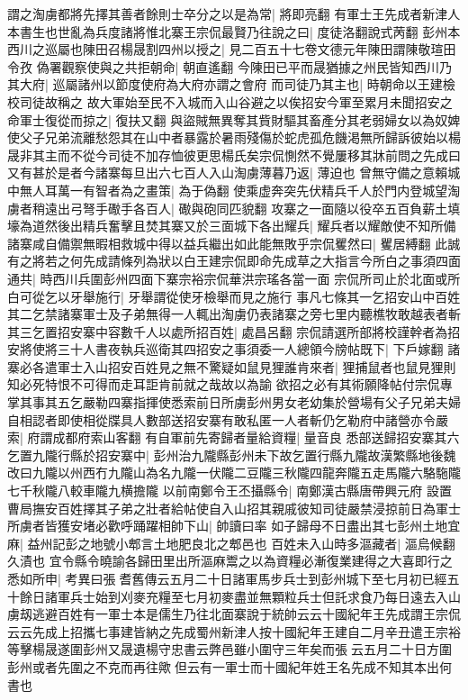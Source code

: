 謂之淘虜都將先擇其善者餘則士卒分之以是為常|{
	將即亮翻}
有軍士王先成者新津人本書生也世亂為兵度諸將惟北寨王宗侃最賢乃往說之曰|{
	度徒洛翻說式苪翻}
彭州本西川之巡屬也陳田召楊晟割四州以授之|{
	見二百五十七卷文德元年陳田謂陳敬瑄田令孜}
偽署觀察使與之共拒朝命|{
	朝直遙翻}
今陳田已平而晟猶據之州民皆知西川乃其大府|{
	巡屬諸州以節度使府為大府亦謂之會府}
而司徒乃其主也|{
	時朝命以王建檢校司徒故稱之}
故大軍始至民不入城而入山谷避之以俟招安今軍至累月未聞招安之命軍士復從而掠之|{
	復扶又翻}
與盜賊無異奪其貲財驅其畜產分其老弱婦女以為奴婢使父子兄弟流離愁怨其在山中者暴露於暑雨殘傷於蛇虎孤危饑渇無所歸訴彼始以楊晟非其主而不從今司徒不加存恤彼更思楊氏矣宗侃惻然不覺屢移其牀前問之先成曰又有甚於是者今諸寨每旦出六七百人入山淘虜薄暮乃返|{
	薄迫也}
曾無守備之意賴城中無人耳萬一有智者為之畫策|{
	為于偽翻}
使乘虚奔突先伏精兵千人於門内登城望淘虜者稍遠出弓弩手礮手各百人|{
	礮與砲同匹貌翻}
攻寨之一面隨以役卒五百負薪土填壕為道然後出精兵奮擊且焚其寨又於三面城下各出耀兵|{
	耀兵者以耀敵使不知所備}
諸寨咸自備禦無暇相救城中得以益兵繼出如此能無敗乎宗侃矍然曰|{
	矍居縛翻}
此誠有之將若之何先成請條列為狀以白王建宗侃即命先成草之大指言今所白之事須四面通共|{
	時西川兵圍彭州四面下寨宗裕宗侃華洪宗瑤各當一面}
宗侃所司止於北面或所白可從乞以牙舉施行|{
	牙舉謂從使牙檢舉而見之施行}
事凡七條其一乞招安山中百姓其二乞禁諸寨軍士及子弟無得一人輒出淘虜仍表諸寨之旁七里内聽樵牧敢越表者斬其三乞置招安寨中容數千人以處所招百姓|{
	處昌呂翻}
宗侃請選所部將校謹幹者為招安將使將三十人書夜執兵巡衛其四招安之事須委一人總領今牓帖既下|{
	下戶嫁翻}
諸寨必各遣軍士入山招安百姓見之無不驚疑如鼠見狸誰肯來者|{
	狸捕鼠者也鼠見狸則知必死特恨不可得而走耳詎肯前就之哉故以為諭}
欲招之必有其術願降帖付宗侃專掌其事其五乞嚴勒四寨指揮使悉索前日所虜彭州男女老幼集於營場有父子兄弟夫婦自相認者即使相從牒具人數部送招安寨有敢私匿一人者斬仍乞勒府中諸營亦令嚴索|{
	府謂成都府索山客翻}
有自軍前先寄歸者量給資糧|{
	量音良}
悉部送歸招安寨其六乞置九隴行縣於招安寨中|{
	彭州治九隴縣彭州未下故乞置行縣九隴故漢繁縣地後魏改曰九隴以州西冇九隴山為名九隴一伏隴二豆隴三秋隴四龍奔隴五走馬隴六駱駞隴七千秋隴八較車隴九横擔隴}
以前南鄭令王丕攝縣令|{
	南鄭漢古縣唐帶興元府}
設置曹局撫安百姓擇其子弟之壯者給帖使自入山招其親戚彼知司徒嚴禁浸掠前日為軍士所虜者皆獲安堵必歡呼踊躍相帥下山|{
	帥讀曰率}
如子歸母不日盡出其七彭州土地宜麻|{
	益州記彭之地號小郫言土地肥良北之郫邑也}
百姓未入山時多漚藏者|{
	漚烏候翻久漬也}
宜令縣令曉諭各歸田里出所漚麻鬻之以為資糧必漸復業建得之大喜即行之悉如所申|{
	考異曰張耆舊傳云五月二十日諸軍馬步兵士到彭州城下至七月初已經五十餘日諸軍兵士始到刈麥充糧至七月初麥盡並無顆粒兵士但託求食乃每日遠去入山虜刼逃避百姓有一軍士本是儒生乃往北面寨說于統帥云云十國紀年王先成謂王宗侃云云先成上招攜七事建皆納之先成蜀州新津人按十國紀年王建自二月辛丑遣王宗裕等擊楊晟遂圍彭州又晟遺楊守忠書云弊邑雖小圍守三年矣而張云五月二十日方圍彭州或者先圍之不克而再往歟但云有一軍士而十國紀年姓王名先成不知其本出何書也}
